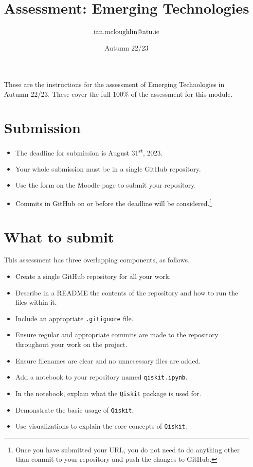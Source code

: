 \documentclass[a4paper]{tufte-handout}
\title{Assessment: Emerging Technologies}
\author{ian.mcloughlin@atu.ie}
\date{Autumn 22/23}
\begin{document}
 
\maketitle

These are the instructions for the assessment of Emerging Technologies in Autumn 22/23.
These cover the full 100\% of the assessment for this module.


\section{Submission}

\begin{itemize}
  \item The deadline for submission is August 31\textsuperscript{st}, 2023. 
  \item Your whole submission must be in a single GitHub repository.
  \item Use the form on the Moodle page to submit your repository.
  \item Commits in GitHub on or before the deadline will be considered.\footnote{Once you have submitted your URL, you do not need to do anything other than commit to your repository and push the changes to GitHub.}
\end{itemize}


\section{What to submit}
This assessment has three overlapping components, as follows.

\begin{itemize}
  \item Create a single GitHub repository for all your work.
  \item Describe in a README the contents of the repository and how to run the files within it.
  \item Include an appropriate \texttt{.gitignore} file.
  \item Ensure regular and appropriate commits are made to the repository throughout your work on the project.
  \item Ensure filenames are clear and no unnecessary files are added.
\end{itemize}

\begin{itemize}
  \item Add a notebook to your repository named \texttt{qiskit.ipynb}.
  \item In the notebook, explain what the \texttt{Qiskit} package is used for.
  \item Demonstrate the basic usage of \texttt{Qiskit}.
  \item Use visualizations to explain the core concepts of \texttt{Qiskit}.
\end{itemize}
\end{document}
